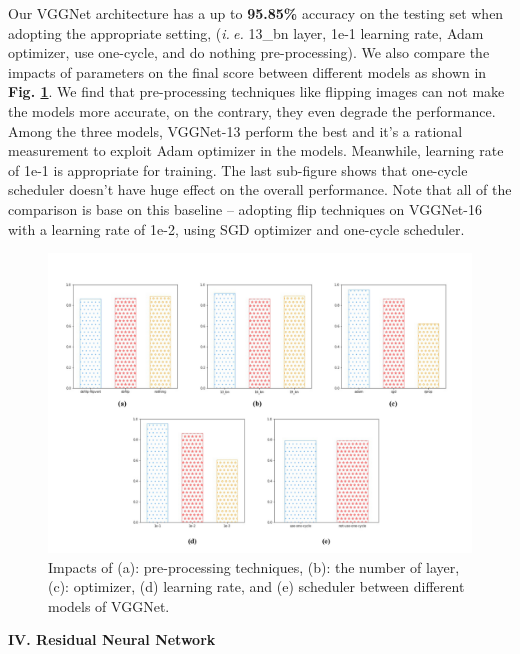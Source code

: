 \documentclass[a4paper]{article}
\begin{document}
\large{
Our \textsf{VGGNet} architecture has a up to \textbf{95.85\%} accuracy on the testing set when adopting the appropriate setting, (\textit{i.$\ $e.} 13\_bn layer, 1e-1 learning rate, Adam optimizer, use one-cycle, and do nothing pre-processing). We also compare the impacts of parameters on the final score between different models as shown in \textbf{Fig. \ref{vggcompare}}. We find that pre-processing techniques like flipping images can not make the models more accurate, on the contrary, they even degrade the performance. Among the three models, \textsf{VGGNet-13} perform the best and it's a rational measurement to exploit Adam optimizer in the models. Meanwhile, learning rate of 1e-1 is appropriate for training. The last sub-figure shows that one-cycle scheduler doesn't have huge effect on the overall performance. Note that all of the comparison is base on this baseline -- adopting flip techniques on \textsf{VGGNet-16} with a learning rate of 1e-2, using SGD optimizer and one-cycle scheduler.

\begin{figure}[h]
\centering
\includegraphics[width=15cm]{vgg.pdf}
\caption{ Impacts of (a): pre-processing techniques, (b): the number of layer, (c): optimizer, (d) learning rate, and (e) scheduler between different models of \textsf{VGGNet}.}
\label{vggcompare}
\end{figure}
}


\clearpage
\vspace{5mm}
\begin{center}
\LARGE\textbf{IV. Residual Neural Network} \\
\end{center}
\vspace{2mm}
\end{document}
